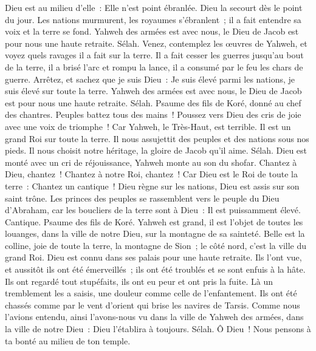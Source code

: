 \begin{multicols}{2}
Dieu est au milieu d'elle~: Elle n'est point ébranlée. Dieu la secourt dès le point du jour.
Les nations murmurent, les royaumes s'ébranlent~; il a fait entendre sa voix et la terre se fond.
Yahweh des armées est avec nous, le Dieu de Jacob est pour nous une haute retraite. Sélah.
Venez, contemplez les œuvres de Yahweh, et voyez quels ravages il a fait sur la terre.
Il a fait cesser les guerres jusqu'au bout de la terre, il a brisé l'arc et rompu la lance, il a consumé par le feu les chars de guerre.
Arrêtez, et sachez que je suis Dieu~: Je suis élevé parmi les nations, je suis élevé sur toute la terre.
Yahweh des armées est avec nous, le Dieu de Jacob est pour nous une haute retraite. Sélah.
\VerseOne{}Psaume des fils de Koré, donné au chef des chantres.
Peuples battez tous des mains~! Poussez vers Dieu des cris de joie avec une voix de triomphe~!
Car Yahweh, le Très-Haut, est terrible. Il est un grand Roi sur toute la terre.
Il nous assujettit des peuples et des nations sous nos pieds.
Il nous choisit notre héritage, la gloire de Jacob qu'il aime. Sélah.
Dieu est monté avec un cri de réjouissance, Yahweh monte au son du shofar.
Chantez à Dieu, chantez~! Chantez à notre Roi, chantez~!
Car Dieu est le Roi de toute la terre~: Chantez un cantique~!
Dieu règne sur les nations, Dieu est assis sur son saint trône.
Les princes des peuples se rassemblent vers le peuple du Dieu d'Abraham, car les boucliers de la terre sont à Dieu~: Il est puissamment élevé.
\VerseOne{}Cantique. Psaume des fils de Koré.
Yahweh est grand, il est l'objet de toutes les louanges, dans la ville de notre Dieu, sur la montagne de sa sainteté.
Belle est la colline, joie de toute la terre, la montagne de Sion~; le côté nord, c'est la ville du grand Roi.
Dieu est connu dans ses palais pour une haute retraite.
Ils l'ont vue, et aussitôt ils ont été émerveillés~; ils ont été troublés et se sont enfuis à la hâte.
Ils ont regardé tout stupéfaits, ils ont eu peur et ont pris la fuite.
Là un tremblement les a saisis, une douleur comme celle de l'enfantement.
Ils ont été chassés comme par le vent d'orient qui brise les navires de Tarsis.
Comme nous l'avions entendu, ainsi l'avons-nous vu dans la ville de Yahweh des armées, dans la ville de notre Dieu~: Dieu l'établira à toujours. Sélah.
Ô Dieu~! Nous pensons à ta bonté au milieu de ton temple.

\end{multicols}
